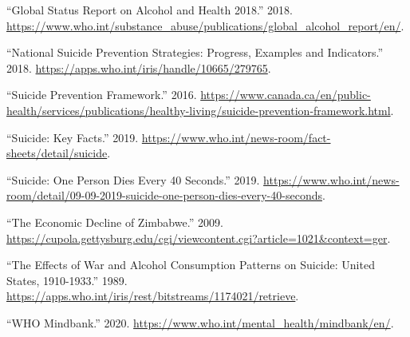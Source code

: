 \documentclass[]{article}
\begin{document}
\hypertarget{ref-alcoholreport}{}
``Global Status Report on Alcohol and Health 2018.'' 2018.
\href{\%20https://www.who.int/substance_abuse/publications/global_alcohol_report/en/}{https://www.who.int/substance\_abuse/publications/global\_alcohol\_report/en/}.

\hypertarget{ref-strategy}{}
``National Suicide Prevention Strategies: Progress, Examples and
Indicators.'' 2018.
\href{\%20https://apps.who.int/iris/handle/10665/279765}{https://apps.who.int/iris/handle/10665/279765}.

\hypertarget{ref-framework2016}{}
``Suicide Prevention Framework.'' 2016.
\url{https://www.canada.ca/en/public-health/services/publications/healthy-living/suicide-prevention-framework.html}.

\hypertarget{ref-stats2019}{}
``Suicide: Key Facts.'' 2019.
\url{https://www.who.int/news-room/fact-sheets/detail/suicide}.

\hypertarget{ref-who2019}{}
``Suicide: One Person Dies Every 40 Seconds.'' 2019.
\url{https://www.who.int/news-room/detail/09-09-2019-suicide-one-person-dies-every-40-seconds}.

\hypertarget{ref-zimbabwe2009}{}
``The Economic Decline of Zimbabwe.'' 2009.
\url{https://cupola.gettysburg.edu/cgi/viewcontent.cgi?article=1021\&context=ger}.

\hypertarget{ref-prohibition}{}
``The Effects of War and Alcohol Consumption Patterns on Suicide: United
States, 1910-1933.'' 1989.
\href{\%20https://apps.who.int/iris/rest/bitstreams/1174021/retrieve}{https://apps.who.int/iris/rest/bitstreams/1174021/retrieve}.

\hypertarget{ref-mindbank}{}
``WHO Mindbank.'' 2020.
\url{https://www.who.int/mental_health/mindbank/en/}.
\end{document}
